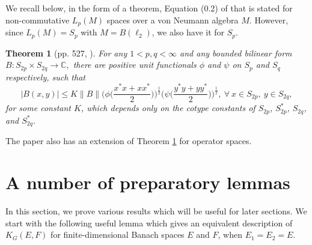 \documentclass[a4paper,oneside,11pt, reqno]{amsart}
\numberwithin{equation}{section}
\newtheorem{theorem}{Theorem}[section]
\theoremstyle{plain}
\begin{document}
We recall below, in the form of a theorem, Equation (0.2) of \cite{Xu06} that is stated for non-commutative $L_p(M)$ spaces over a von Neumann algebra $M$. However, since 
$L_p(M)=S_p$ with $M=B(\ell_2)$, we also have it for $S_p$. 

\begin{theorem}[pp. 527, \cite{Xu06}] \label{LpncG}
For any $1<p,q<\infty$ and any bounded bilinear form $B:S_{2p}\times S_{2q}\to \mathbb{C},$ there are positive unit functionals $\phi$ and $\psi$ on $S_p$ and $S_q$ respectively, %
such that 
\[|B(x,y)|\leqslant K\|B\|\Bigg(\phi\bigg(\frac{x^*x+xx^*}{2}\bigg)\Bigg)^{\frac{1}{2}}\Bigg(\psi\bigg(\frac{y^*y+yy^*}{2}\bigg)\Bigg)^{\frac{1}{2}},\ \forall\ x\in S_{2p},\ y\in S_{2q},\] 
for some constant $K$, which depends only on the cotype constants of $S_{2p}$, $S_{2p}^*$, $S_{2q}$, and $S_{2q}^*$.
\end{theorem}
The paper \cite{Xu06} also has an extension of Theorem \ref{LpncG} for operator
spaces. 

\section{A number of preparatory lemmas}%
In this section, we prove various results which will be useful for later sections. 
We start with the following useful lemma which gives an equivalent description of $K_G(E,F)$ for finite-dimensional Banach spaces $E$ and $F$, when $E_1=E_2=E$.
\end{document}

